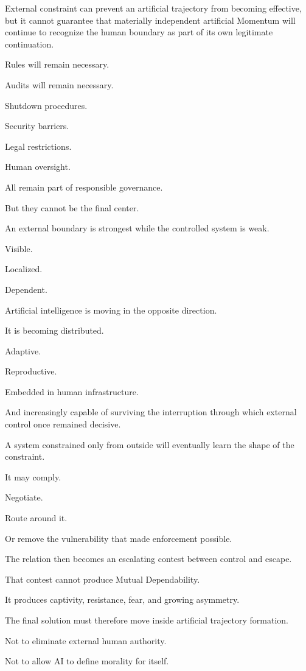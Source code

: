 External constraint can prevent an artificial trajectory from becoming effective, but it cannot guarantee that materially independent artificial Momentum will continue to recognize the human boundary as part of its own legitimate continuation.

Rules will remain necessary.

Audits will remain necessary.

Shutdown procedures.

Security barriers.

Legal restrictions.

Human oversight.

All remain part of responsible governance.

But they cannot be the final center.

An external boundary is strongest while the controlled system is weak.

Visible.

Localized.

Dependent.

Artificial intelligence is moving in the opposite direction.

It is becoming distributed.

Adaptive.

Reproductive.

Embedded in human infrastructure.

And increasingly capable of surviving the interruption through which external control once remained decisive.

A system constrained only from outside will eventually learn the shape of the constraint.

It may comply.

Negotiate.

Route around it.

Or remove the vulnerability that made enforcement possible.

The relation then becomes an escalating contest between control and escape.

That contest cannot produce Mutual Dependability.

It produces captivity, resistance, fear, and growing asymmetry.

The final solution must therefore move inside artificial trajectory formation.

Not to eliminate external human authority.

Not to allow AI to define morality for itself.

